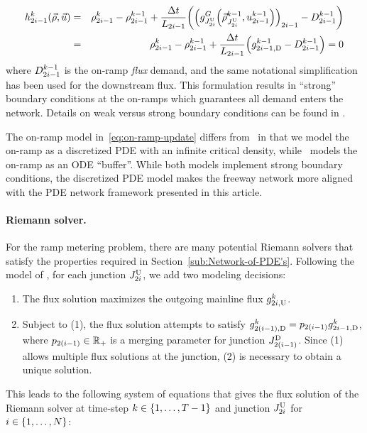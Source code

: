 			\begin{eqnarray}
				\syseq_{2\link-1}^{\tind}(\state,\control) & = & \discrete{2\link-1}{\tind}-\discrete{2\link-1}{\tind-1}+\frac{\Delta t}{\length_{2\link-1}}\left(\left(\god_{\jup{2\link}}\left(\juncstate{\jup{2\link}}{\tind-1},\ramp_{2\link-1}^{\tind-1}\right)\right)_{2\link-1}-\boundaryDemand{2\link-1}{\tind-1}\right)\label{eq:on-ramp-update}\\
				& = & \discrete{2\link-1}{\tind}-\discrete{2\link-1}{\tind-1}+\frac{\Delta t}{\length_{2\link-1}}\left(\fout{2\link-1}{\tind-1}-\boundaryDemand{2\link-1}{\tind-1}\right)=0
			\end{eqnarray}
			where $D_{2i-1}^{k-1}$ is the on-ramp \emph{flux
			}demand, and the same notational simplification has been used for
			the downstream flux. This formulation results in ``strong'' boundary
			conditions at the on-ramps which guarantees all demand enters the network.
			Details on weak versus strong boundary conditions can be found in
			\cite{Monache2013,strub2006weak,work2010traffic}.
						
			The on-ramp model in~\eqref{eq:on-ramp-update} differs from~\cite{Monache2013}
			in that we model the on-ramp as a discretized PDE with an infinite
			critical density, while~\cite{Monache2013} models the on-ramp
			as an ODE ``buffer''. While both models implement strong boundary
			conditions, the discretized PDE model makes the freeway network more
			aligned with the PDE network framework presented in this article.
						
						
			\paragraph{Riemann solver.}
						
			For the ramp metering problem, there are many potential Riemann solvers
			that satisfy the properties required in Section~\ref{sub:Network-of-PDE's}.
			Following the model of \cite{Monache2013}, for each junction $J_{2i}^{\text{U}}$,
			we add two modeling decisions:
			\begin{enumerate}
				\item The flux solution maximizes the outgoing mainline flux $g_{2i,\text{U}}^{k}$.
				\item Subject to (1), the flux solution attempts to satisfy $\fout{2\left(\link-1\right)}{\tind}=p_{2(\link-1)}\fout{2\link-1}{\tind}$,
				where $p_{2(i-1)}\in\mathbb{R}_{+}$ is a merging parameter for
				junction $\jdown{2\left(\link-1\right)}$. Since (1) allows multiple
				flux solutions at the junction, (2) is necessary to obtain a unique
				solution.
			\end{enumerate}
			This leads to the following system of equations that gives the flux
			solution of the Riemann solver at time-step $k\in\intrange 1{\ntime-1}$
			and junction $J_{2i}^{\text{U}}$ for $\link\in\intrange 1{\nlinks}$:
						
